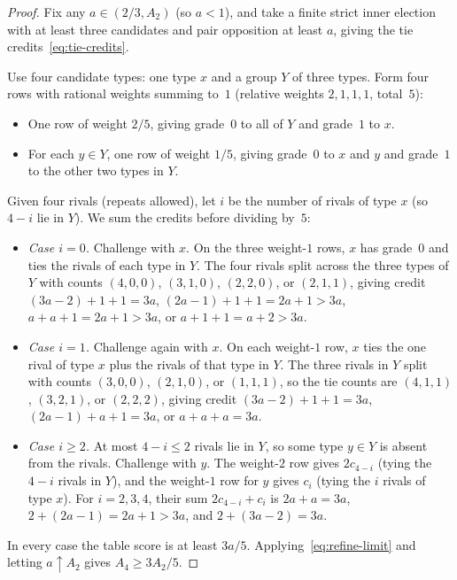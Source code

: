 \documentclass[11pt,letterpaper]{article}
\theoremstyle{cleanthm}
\begin{document}
\begin{proof}
Fix any \(a\in(2/3,A_2)\) (so \(a<1\)), and take a finite strict inner election with at least
three candidates and pair opposition at least \(a\), giving the tie
credits~\eqref{eq:tie-credits}.

Use four candidate types: one type \(x\) and a group \(Y\) of three types. Form four rows with
rational weights summing to~\(1\) (relative weights \(2,1,1,1\), total~\(5\)):
\begin{itemize}
 \item One row of weight \(2/5\), giving grade~\(0\) to all of \(Y\) and grade~\(1\) to \(x\).
 \item For each \(y\in Y\), one row of weight \(1/5\), giving grade~\(0\) to \(x\) and \(y\) and
   grade~\(1\) to the other two types in \(Y\).
\end{itemize}
Given four rivals (repeats allowed), let \(i\) be the number of rivals of type \(x\) (so \(4-i\)
lie in \(Y\)). We sum the credits before dividing by~\(5\):
\begin{itemize}
 \item \emph{Case \(i=0\).} Challenge with \(x\). On the three weight-\(1\) rows, \(x\) has
   grade~\(0\) and ties the rivals of each type in \(Y\). The four rivals split across the three
   types of \(Y\) with counts \((4,0,0)\), \((3,1,0)\), \((2,2,0)\), or \((2,1,1)\), giving credit
   \((3a-2)+1+1=3a\), \((2a-1)+1+1=2a+1>3a\), \(a+a+1=2a+1>3a\), or \(a+1+1=a+2>3a\).
 \item \emph{Case \(i=1\).} Challenge again with \(x\). On each weight-\(1\) row, \(x\) ties the
   one rival of type \(x\) plus the rivals of that type in \(Y\). The three rivals in \(Y\) split
   with counts \((3,0,0)\), \((2,1,0)\), or \((1,1,1)\), so the tie counts are \((4,1,1)\),
   \((3,2,1)\), or \((2,2,2)\), giving credit \((3a-2)+1+1=3a\), \((2a-1)+a+1=3a\), or
   \(a+a+a=3a\).
 \item \emph{Case \(i\ge 2\).} At most \(4-i\le 2\) rivals lie in \(Y\), so some type \(y\in Y\)
   is absent from the rivals. Challenge with \(y\). The weight-\(2\) row gives \(2c_{4-i}\) (tying
   the \(4-i\) rivals in \(Y\)), and the weight-\(1\) row for \(y\) gives \(c_i\) (tying the \(i\)
   rivals of type \(x\)). For \(i=2,3,4\), their sum \(2c_{4-i}+c_i\) is \(2a+a=3a\),
   \(2+(2a-1)=2a+1>3a\), and \(2+(3a-2)=3a\).
\end{itemize}
In every case the table score is at least \(3a/5\). Applying~\eqref{eq:refine-limit} and letting
\(a\uparrow A_2\) gives \(A_4\ge 3A_2/5\).
\end{proof}
\end{document}
